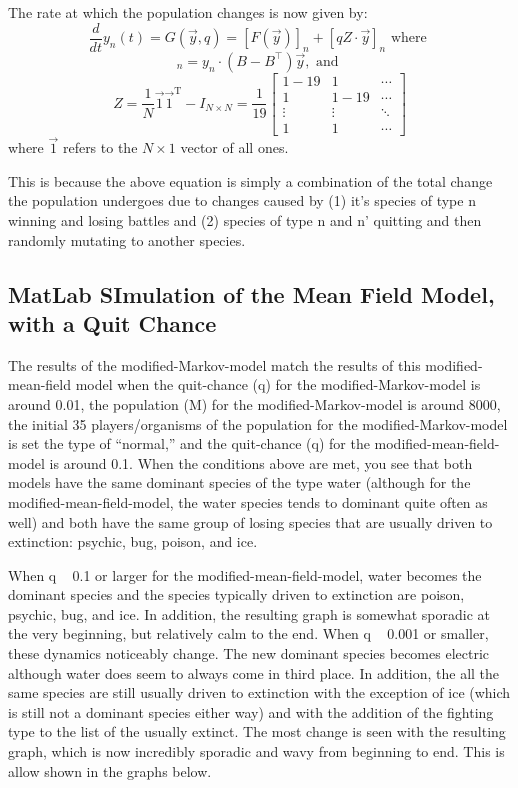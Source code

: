\documentclass[border=1pt]{article}
\begin{document}
The rate at which the population changes is now given by:
\begin{equation}
\frac{d}{d t} y_{n}(t)=G(\vec{y}, q)=[F(\vec{y})]_{n}+[q Z \cdot \vec{y}]_{n} \text { where }
\end{equation}
\begin{equation}
[F(\vec{y})]_{n}=y_{n} \cdot\left(B-B^{\top}\right) \vec{y}, \text { and }
\end{equation}
\begin{equation}
Z=\frac{1}{N} \overrightarrow{1} \overrightarrow{1}^{\mathrm{T}}-I_{N \times N}=\frac{1}{19}\left[\begin{array}{ccc}{1-19} & {1} & {\cdots} \\ {1} & {1-19} & {\cdots} \\ {\vdots} & {\vdots} & {\ddots} \\ {1} & {1} & {\cdots}\end{array}\right]
\end{equation}
where $\overrightarrow{1}$ refers to the $N \times 1$ vector of all ones.

This is because the above equation is simply a combination of the total change the population undergoes due to changes caused by (1) it’s species of type n winning and losing battles and (2) species of type n and n’ quitting and then randomly mutating to another species.

\subsection{MatLab SImulation of the Mean Field Model, with a Quit Chance}
The results of the modified-Markov-model match the results of this modified-mean-field model when the quit-chance (q) for the modified-Markov-model is around 0.01, the population (M) for the modified-Markov-model is around 8000, the initial 35 players/organisms of the population for the modified-Markov-model is set the type of “normal,” and the quit-chance (q) for the modified-mean-field-model is around 0.1. When the conditions above are met, you see that both models have the same dominant species of the type water (although for the modified-mean-field-model, the water species tends to dominant quite often as well) and both have the same group of losing species that are usually driven to extinction: psychic, bug, poison, and ice.

When q ~ 0.1 or larger for the modified-mean-field-model, water becomes the dominant species and the species typically driven to extinction are poison, psychic, bug, and ice. In addition, the resulting graph is somewhat sporadic at the very beginning, but relatively calm to the end. When q ~ 0.001 or smaller, these dynamics noticeably change. The new dominant species becomes electric although water does seem to always come in third place. In addition, the all the same species are still usually driven to extinction with the exception of ice (which is still not a dominant species either way) and with the addition of the fighting type to the list of the usually extinct. The most change is seen with the resulting graph, which is now incredibly sporadic and wavy from beginning to end. This is allow shown in the graphs below.
\end{document}
